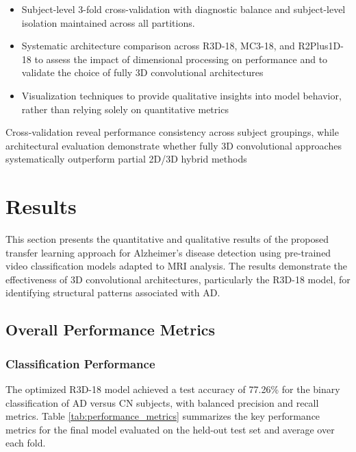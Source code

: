 \documentclass[12pt, a4paper]{article}
\begin{document}
\begin{itemize}
    \item Subject-level 3-fold cross-validation with diagnostic balance and subject-level isolation maintained across all partitions.
    
    \item Systematic architecture comparison across R3D-18, MC3-18, and R2Plus1D-18 to assess the impact of dimensional processing on performance and to validate the choice of fully 3D convolutional architectures
    
    \item Visualization techniques to provide qualitative insights into model behavior, rather than relying solely on quantitative metrics
\end{itemize}

Cross-validation reveal performance consistency across subject groupings, while architectural evaluation demonstrate whether fully 3D convolutional approaches systematically outperform partial 2D/3D hybrid methods

\section{Results}

This section presents the quantitative and qualitative results of the proposed transfer learning approach for Alzheimer's disease detection using pre-trained video classification models adapted to MRI analysis. The results demonstrate the effectiveness of 3D convolutional architectures, particularly the R3D-18 model, for identifying structural patterns associated with AD.

\subsection{Overall Performance Metrics}

\subsubsection{Classification Performance}

The optimized R3D-18 model achieved a test accuracy of 77.26\% for the binary classification of AD versus CN subjects, with balanced precision and recall metrics. Table \ref{tab:performance_metrics} summarizes the key performance metrics for the final model evaluated on the held-out test set and average over each fold.
\end{document}
